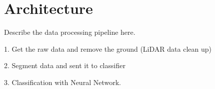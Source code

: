 \section{Architecture}


Describe the data processing pipeline here. 


1. Get the raw data and remove the ground (LiDAR data clean up)

2. Segment data and sent it to classifier 

3. Classification with Neural Network. 

